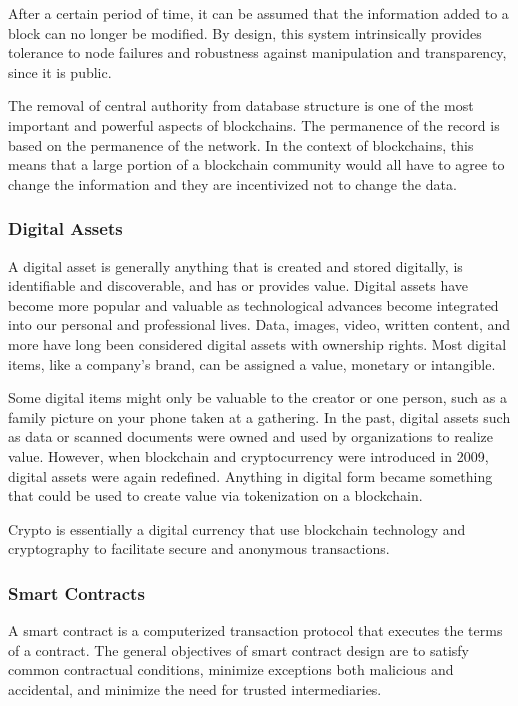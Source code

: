 \documentclass[MSE,Master,english]{twbook}%
\begin{document}
After a certain period of time, it can be assumed that the information added to a block can no longer be modified. By design, this system intrinsically provides tolerance to node failures and robustness against manipulation and transparency, since it is public.

The removal of central authority from database structure is one of the most important and powerful aspects of blockchains. The permanence of the record is based on the permanence of the network. In the context of blockchains, this means that a large portion of a blockchain community would all have to agree to change the information and they are incentivized not to change the data.

\subsubsection{Digital Assets}
A digital asset is generally anything that is created and stored digitally, is identifiable and discoverable, and has or provides value. Digital assets have become more popular and valuable as technological advances become integrated into our personal and professional lives. Data, images, video, written content, and more have long been considered digital assets with ownership rights. Most digital items, like a company's brand, can be assigned a value, monetary or intangible.

Some digital items might only be valuable to the creator or one person, such as a family picture on your phone taken at a gathering. In the past, digital assets such as data or scanned documents were owned and used by organizations to realize value. However, when blockchain and cryptocurrency were introduced in 2009, digital assets were again redefined. Anything in digital form became something that could be used to create value via tokenization on a blockchain.

Crypto is essentially a digital currency that use blockchain technology and cryptography to facilitate secure and anonymous transactions.

\subsubsection{Smart Contracts}
A smart contract is a computerized transaction protocol that executes the terms of a contract. The general objectives of smart contract design are to satisfy common contractual conditions, minimize exceptions both malicious and accidental, and minimize the need for trusted intermediaries.
\end{document}
